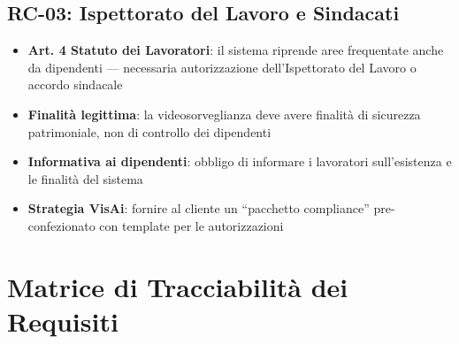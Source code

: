 \documentclass[a4paper, 12pt]{article}
\begin{document}
\subsection{RC-03: Ispettorato del Lavoro e Sindacati}

\begin{itemize}
    \item \textbf{Art. 4 Statuto dei Lavoratori}: il sistema riprende aree frequentate anche da dipendenti — necessaria autorizzazione dell'Ispettorato del Lavoro o accordo sindacale
    \item \textbf{Finalità legittima}: la videosorveglianza deve avere finalità di sicurezza patrimoniale, non di controllo dei dipendenti
    \item \textbf{Informativa ai dipendenti}: obbligo di informare i lavoratori sull'esistenza e le finalità del sistema
    \item \textbf{Strategia VisAi}: fornire al cliente un ``pacchetto compliance'' pre-confezionato con template per le autorizzazioni
\end{itemize}

\section{Matrice di Tracciabilità dei Requisiti}
\end{document}
